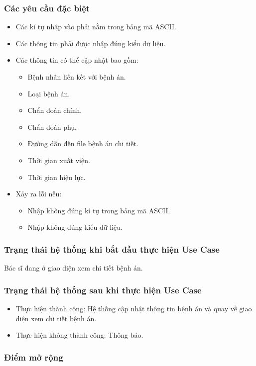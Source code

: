 \subsubsection{Các yêu cầu đặc biệt}
\begin{itemize}
  \item Các kí tự nhập vào phải nằm trong bảng mã ASCII.
  \item Các thông tin phải được nhập đúng kiểu dữ liệu.
  \item Các thông tin có thể cập nhật bao gồm:
    \begin{itemize}
      \item Bệnh nhân liên kết với bệnh án.
      \item Loại bệnh án.
      \item Chẩn đoán chính.
      \item Chẩn đoán phụ.
      \item Đường dẫn đến file bệnh án chi tiết.
      \item Thời gian xuất viện.
      \item Thời gian hiệu lực.
    \end{itemize}
  \item Xảy ra lỗi nếu:
    \begin{itemize}
      \item Nhập không đúng kí tự trong bảng mã ASCII.
      \item Nhập không đúng kiểu dữ liệu.
    \end{itemize}
\end{itemize}

\subsubsection{Trạng thái hệ thống khi bắt đầu thực hiện Use Case}
Bác sĩ đang ở giao diện xem chi tiết bệnh án.

\subsubsection{Trạng thái hệ thống sau khi thực hiện Use Case}
\begin{itemize}
  \item Thực hiện thành công: Hệ thống cập nhật thông tin bệnh án và quay về giao diện xem chi tiết bệnh án.
  \item Thực hiện không thành công: Thông báo.
\end{itemize}

\subsubsection{Điểm mở rộng}